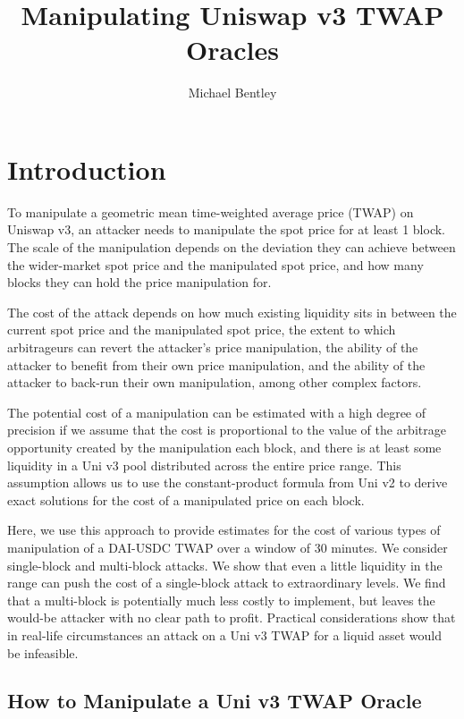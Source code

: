 \documentclass[a4paper, 11pt]{article}
\begin{document}
\title{Manipulating Uniswap v3 TWAP Oracles}
\author{Michael Bentley}

\maketitle

\section{Introduction}

To manipulate a geometric mean time-weighted average price (TWAP) on Uniswap v3, an attacker needs to manipulate the spot price for at least 1 block. The scale of the manipulation depends on the deviation they can achieve between the wider-market spot price and the manipulated spot price, and how many blocks they can hold the price manipulation for. 

The cost of the attack depends on how much existing liquidity sits in between the current spot price and the manipulated spot price, the extent to which arbitrageurs can revert the attacker's price manipulation, the ability of the attacker to benefit from their own price manipulation, and the ability of the attacker to back-run their own manipulation, among other complex factors.

The potential cost of a manipulation can be estimated with a high degree of precision if we assume that the cost is proportional to the value of the arbitrage opportunity created by the manipulation each block, and there is at least some liquidity in a Uni v3 pool distributed across the entire price range. This assumption allows us to use the constant-product formula from Uni v2 to derive exact solutions for the cost of a manipulated price on each block. 

Here, we use this approach to provide estimates for the cost of various types of manipulation of a DAI-USDC TWAP over a window of 30 minutes. We consider single-block and multi-block attacks. We show that even a little liquidity in the range can push the cost of a single-block attack to extraordinary levels. We find that a multi-block is potentially much less costly to implement, but leaves the would-be attacker with no clear path to profit. Practical considerations show that in real-life circumstances an attack on a Uni v3 TWAP for a liquid asset would be infeasible. 

\subsection{How to Manipulate a Uni v3 TWAP Oracle}
\end{document}
